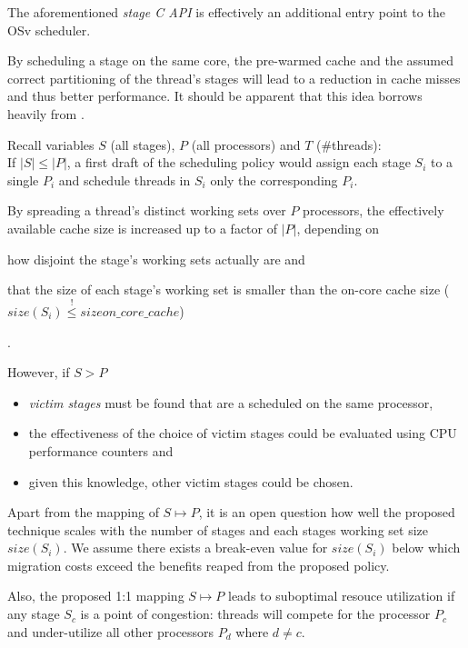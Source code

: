 \documentclass{article}
\begin{document}
The aforementioned \textit{stage C API} is effectively an additional entry point to the OSv scheduler.

By scheduling a stage on the same core, the pre-warmed cache and
the assumed correct partitioning of the thread's stages
will lead to a reduction in cache misses and thus better performance.
It should be apparent that this idea borrows heavily from \cite{sodaspr,cohort}.

Recall variables \textbf{$S$} (all stages), \textbf{$P$} (all processors) and \textbf{$T$} (\#threads):\\
If $|S| \le |P|$, a first draft of the scheduling policy would
assign each stage $S_i$ to a single $P_i$ and schedule threads in $S_i$ only the corresponding $P_i$.

By spreading a thread's distinct working sets over $P$ processors,
the effectively available cache size is increased up to a factor of $|P|$, depending on
\begin{enumerate*}
    \item how disjoint the stage's working sets actually are and
    \item that the size of each stage's working set is smaller than the on-core cache size ($size(S_i) \overset{!}{\le} size{on\_core\_cache}$)
\end{enumerate*}.

However, if $S > P$
\begin{itemize}
    \item \textit{victim stages} must be found that are a scheduled on the same processor,
    \item the effectiveness of the choice of victim stages could be evaluated using CPU performance counters and
    \item given this knowledge, other victim stages could be chosen.  
\end{itemize}

Apart from the mapping of $S \mapsto P$, it is an open question how well the proposed technique scales with the number of stages and each stages working set size $size(S_i)$.
We assume there exists a break-even value for $size(S_i)$ below which migration costs exceed the benefits reaped from the proposed policy.

Also, the proposed 1:1 mapping $S \mapsto P$ leads to suboptimal resouce utilization if any stage $S_c$ is a point of congestion:
threads will compete for the processor $P_c$ and under-utilize all other processors $P_d$ where $d \ne c$.
\end{document}
